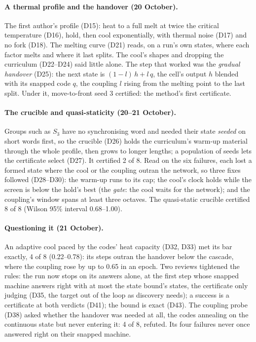 \documentclass[11pt]{article}
\begin{document}
\paragraph{A thermal profile and the handover (20 October).} The first author's profile (D15): heat
to a full melt at twice the critical temperature (D16), hold, then cool exponentially, with thermal
noise (D17) and no fork (D18). The melting curve (D21) reads, on a run's own states, where each
factor melts and where it last splits. The cool's shapes and dropping the curriculum (D22--D24) said
little alone. The step that worked was the \emph{gradual handover} (D25): the next state is
$(1-l)\,h + l\,q$, the cell's output $h$ blended with its snapped code $q$, the coupling $l$ rising
from the melting point to the last split. Under it, move-to-front seed 3 certified: the method's
first certificate.

\paragraph{The crucible and quasi-staticity (20--21 October).} Groups such as $S_3$ have no
synchronising word and needed their state \emph{seeded} on short words first, so the crucible (D26)
holds the curriculum's warm-up material through the whole profile, then grows to longer lengths; a
population of seeds lets the certificate select (D27). It certified 2 of 8. Read on the six failures,
each lost a formed state where the cool or the coupling outran the network, so three fixes followed
(D28--D30): the warm-up runs to its cap; the cool's clock holds while the screen is below the hold's
best (the \emph{gate}: the cool waits for the network); and the coupling's window spans at least three
octaves. The quasi-static crucible certified 8 of 8 (Wilson 95\% interval 0.68--1.00).

\paragraph{Questioning it (21 October).} An adaptive cool paced by the codes' heat capacity
\citep{huang-1986-efficient-cooling-schedule} (D32, D33) met its bar exactly, 4 of 8 (0.22--0.78): its
steps outran the handover below the cascade, where the coupling rose by up to 0.65 in an epoch. Two
reviews tightened the rules: the run now stops on its answers alone, at the first step whose snapped
machine answers right with at most the state bound's states, the certificate only judging (D35, the
target out of the loop as discovery needs); a success is a certificate at both verdicts (D41); the
bound is exact (D43). The coupling probe (D38) asked whether the handover was needed at all, the codes
annealing on the continuous state but never entering it: 4 of 8, refuted. Its four failures never
once answered right on their snapped machine.
\end{document}

